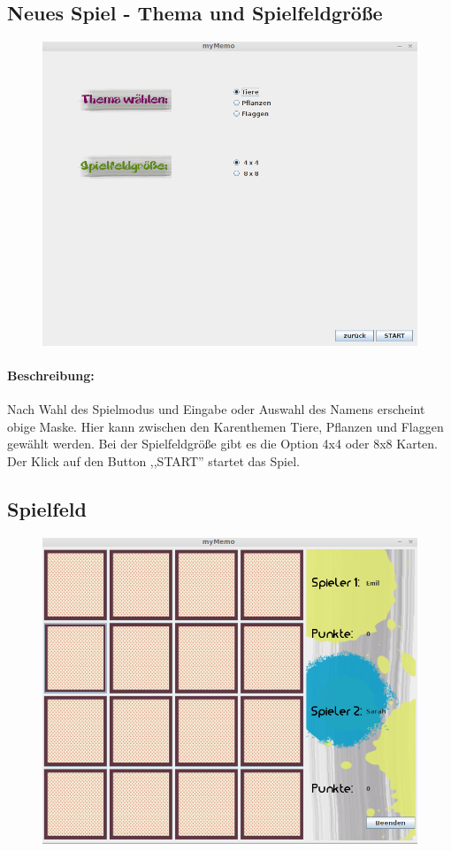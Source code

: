 \subsection{Neues Spiel - Thema und Spielfeldgröße}
\begin{figure}[!h]
	\centering
    \includegraphics[width=\textwidth]{./guiTiere.png}
	\label{}
\end{figure}
\paragraph{Beschreibung: }Nach Wahl des Spielmodus und Eingabe oder Auswahl des Namens erscheint obige Maske. Hier kann zwischen den Karenthemen Tiere, Pflanzen und Flaggen gewählt werden. Bei der Spielfeldgröße gibt es die Option 4x4 oder 8x8 Karten. Der Klick auf den Button ,,START'' startet das Spiel.


\clearpage
\subsection{Spielfeld}
\begin{figure}[!h]
	\centering
    \includegraphics[width=\textwidth]{./guiSpielfeld.png}
	\label{}
\end{figure}
